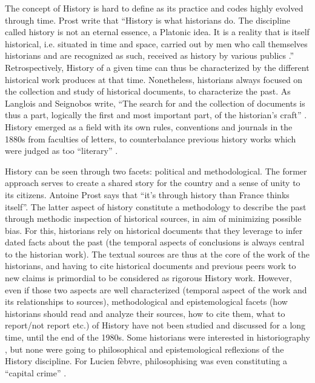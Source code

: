 The concept of History is hard to define as its practice and codes highly evolved through time.
Prost write that ``History is what historians do. The discipline called history is not an eternal essence, a Platonic idea. It is a reality that is itself historical, i.e. situated in time and space, carried out by men who call themselves historians and are recognized as such, received as history by various publics \cite{prost2014}.''
Retrospectively, History of a given time can thus be characterized by the different historical work produces at that time.
Nonetheless, historians always focused on the collection and study of historical documents, to characterize the past.
As Langlois and Seignobos write, ``The search for and the collection of documents is thus a part, logically the first and most important part, of the historian's craft'' \cite{langloisIntroductionAuxÉtudes2014}.
History emerged as a field with its own rules, conventions and journals in the 1880s from faculties of letters, to counterbalance previous history works which were judged as too ``literary'' \cite{noirielNaissanceMétierHistorien1990}.

History can be seen through two facets: political and methodological.
The former approach serves to create a shared story for the country and a sense of unity to its citizens.
Antoine Prost says that ``it's through history than France thinks itself''\cite{prost2014}.
The latter aspect of history constitute a methodology to describe the past through methodic inspection of historical sources, in aim of minimizing possible bias.
For this, historians rely on historical documents that they leverage to infer dated facts about the past (the temporal aspects of conclusions is always central to the historian work).
The textual sources are thus at the core of the work of the historians, and having to cite historical documents and previous peers work to new claims is primordial to be considered as rigorous History work.
However, even if those two aspects are well characterized (temporal aspect of the work and its relationships to sources), methodological and epistemological facets (how historians should read and analyze their sources, how to cite them, what to report/not report etc.) of History have not been studied and discussed for a long time, until the end of the 1980s.
Some historians were interested in historiography \cite{carbonellHistoriographie1981}, but none were going to philosophical and epistemological reflexions of the History discipline.
For Lucien fèbvre, philosophising was even constituting a ``capital crime'' \cite{febvreVERSAUTREHISTOIRE1949, prost2014}.

